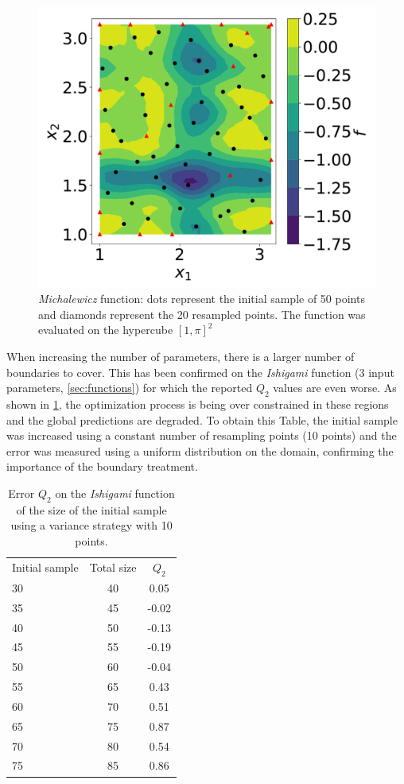 \begin{figure}[ht]
\centering
\includegraphics[width=\linewidth,keepaspectratio]{fig/contributions/resample/3_1column_color-online-only_response_Michalewicz_sigma.pdf}
\caption{\textit{Michalewicz} function: dots represent the initial sample of 50 points and diamonds represent the 20 resampled points. The function was evaluated on the hypercube $[1, \pi]^2$}
\label{fig:rs-michalewicz}
\end{figure}

When increasing the number of parameters, there is a larger number of boundaries to cover. This has been confirmed on the \textit{Ishigami} function (3 input parameters, \cref{sec:functions}) for which the reported $Q_2$ values are even worse. As shown in \cref{tab:size-q2-ishigami}, the optimization process is being over constrained in these regions and the global predictions are degraded. To obtain this Table, the initial sample was increased using a constant number of resampling points (10 points) and the error was measured using a uniform distribution on the domain, confirming the importance of the boundary treatment.

\begin{table}[ht]
\centering
\begin{tabular}{lcc}
\toprule
Initial sample&Total size & $Q_2$ \\
\cmidrule{1-3}
30 & 40 & 0.05  \\
35 & 45 & -0.02 \\
40 & 50 & -0.13 \\
45 & 55 & -0.19 \\
50 & 60 & -0.04 \\
55 & 65 & 0.43  \\
60 & 70 & 0.51  \\
65 & 75 & 0.87  \\
70 & 80 & 0.54  \\
75 & 85 & 0.86  \\
\bottomrule
\end{tabular}
\caption{Error $Q_2$ on the \textit{Ishigami} function of the size of the initial sample using a variance strategy with 10 points.}
\label{tab:size-q2-ishigami}
\end{table}

